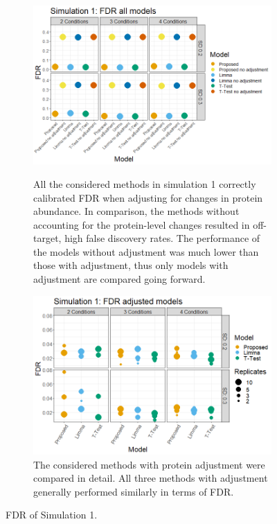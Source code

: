 \documentclass{mcp}
\begin{document}
\begin{figure}[h!]
\centering
 \begin{subfigure}{\textwidth}
  \centering
	\includegraphics[width=.8\textwidth]{sim_new/sim1_FDR_all_models}\\
	\caption{All the considered methods in simulation 1 correctly calibrated FDR  when adjusting for changes in protein abundance. In comparison, the methods without accounting for the protein-level changes resulted in off-target, high false discovery rates. The performance of the models without adjustment was much lower than those with adjustment, thus only models with adjustment are compared going forward.}
 \end{subfigure}
 \begin{subfigure}{\textwidth}
  \centering
	\includegraphics[width=.8\textwidth]{sim_new/sim1_FDR}
	\caption{The considered methods with protein adjustment were compared in detail. All three methods with adjustment generally performed similarly in terms of FDR.}
 \end{subfigure}
 \caption{FDR of Simulation 1.}
\label{fig:sim1_fpr}
\end{figure}
\end{document}
